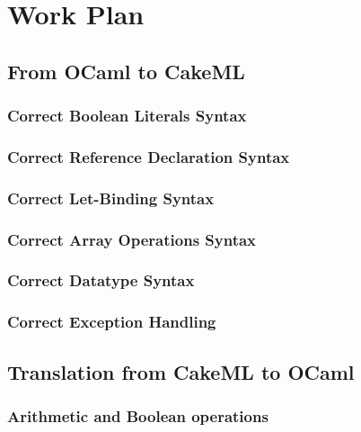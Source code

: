 
%

\chapter{Work Plan}
\label{cha:Work_Plan}

\section{From OCaml to CakeML}

\subsection{Correct Boolean Literals Syntax}

\subsection{Correct Reference Declaration Syntax}

\subsection{Correct Let-Binding Syntax}

\subsection{Correct Array Operations Syntax}

\subsection{Correct Datatype Syntax}

\subsection{Correct Exception Handling}

\section{Translation from CakeML to OCaml}

\subsection{Arithmetic and Boolean operations}

